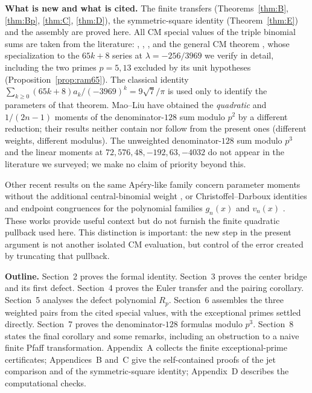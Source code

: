 \documentclass[11pt]{amsart}
\theoremstyle{definition}
\theoremstyle{remark}
\begin{document}
\textbf{What is new and what is cited.} The finite transfers
(Theorems~\ref{thm:B}, \ref{thm:Bp}, \ref{thm:C}, \ref{thm:D}),
the symmetric-square identity (Theorem~\ref{thm:E}) and the assembly are
proved here. All CM special values of the triple binomial sums are taken
from the literature: \cite[Theorems~2.9, 2.10 and Remark~2.3]{SunBQF},
\cite[Theorems~1.5, 1.8]{SunYe}, \cite[Theorem~5.1]{SunL2}, and the
general CM theorem \cite[Theorem~1]{CDLNS}, whose specialization to the
$65k+8$ series at $\lambda=-256/3969$ we verify in detail, including the
two primes $p=5,13$ excluded by its unit hypotheses
(Proposition~\ref{prop:ram65}). The classical identity
$\sum_{k\ge0}(65k+8)a_k/(-3969)^k=9\sqrt7/\pi$ \cite[Table~2]{Guillera}
is used only to identify the parameters of that theorem.
Mao--Liu \cite[Theorem~1.10]{MaoLiu} have obtained the \emph{quadratic}
and $1/(2n-1)$ moments of the denominator-$128$ sum modulo $p^2$ by a
different reduction; their results neither contain nor follow from the
present ones (different weights, different modulus). The unweighted
denominator-$128$ sum modulo $p^3$ and the linear moments at
$72,576,48,-192,63,-4032$ do not appear in the literature we surveyed;
we make no claim of priority beyond this.

Other recent results on the same Ap\'ery-like family concern parameter
moments without the additional central-binomial weight
\cite{MaoYang,Mao}, or Christoffel--Darboux identities and endpoint
congruences for the polynomial families $g_n(x)$ and $v_n(x)$
\cite{SunCD}.  These works provide useful context but do not furnish the
finite quadratic pullback used here.  This distinction is important:
the new step in the present argument is not another isolated CM
evaluation, but control of the error created by truncating that pullback.

\medskip

\textbf{Outline.} Section~2 proves the formal identity.
Section~3 proves the center bridge and its first defect.
Section~4 proves the Euler transfer and the pairing corollary.
Section~5 analyses the defect polynomial $R_p$.
Section~6 assembles the three weighted pairs from the cited special
values, with the exceptional primes settled directly.
Section~7 proves the denominator-$128$ formulas modulo $p^3$.
Section~8 states the final corollary and some remarks, including an
obstruction to a naive finite Pfaff transformation.
Appendix~A collects the finite exceptional-prime certificates;
Appendices~B and~C give the self-contained proofs of the jet comparison
and of the symmetric-square identity; Appendix~D describes the
computational checks.
\end{document}
